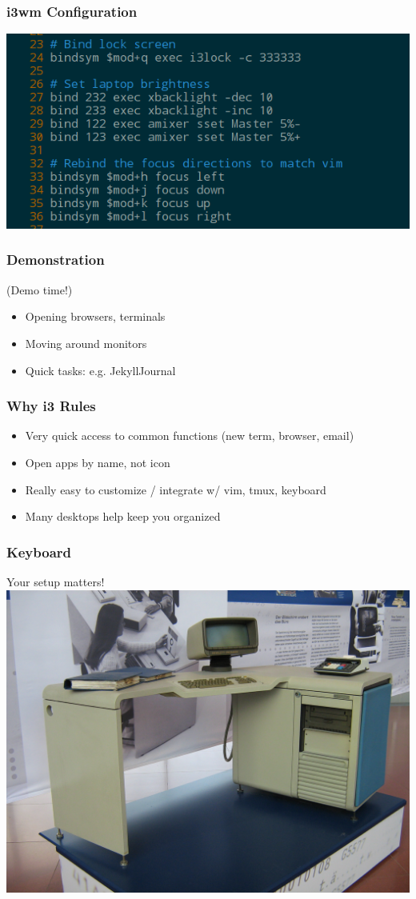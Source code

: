 \documentclass{beamer}
\begin{document}
\begin{frame}
  \frametitle{i3wm Configuration}
  \includegraphics[scale=0.5]{images/i3-lock-and-move-config}
\end{frame}

\begin{frame}
  \frametitle{Demonstration}
  (Demo time!)

  \begin{itemize}
    \item Opening browsers, terminals
    \item Moving around monitors
    \item Quick tasks: e.g. JekyllJournal
  \end{itemize}
\end{frame}

\begin{frame}
  \frametitle{Why i3 Rules}
  \begin{itemize}
    \item Very quick access to common functions (new term, browser, email)
    \item Open apps by name, not icon
    \item Really easy to customize / integrate w/ vim, tmux, keyboard
    \item Many desktops help keep you organized
  \end{itemize}
\end{frame}

\begin{frame}
  \frametitle{Keyboard}
  Your setup matters!
  \includegraphics[scale=0.1]{images/awesome-system}
\end{frame}
\end{document}
